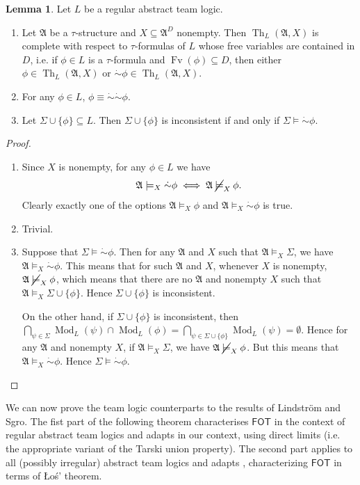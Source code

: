 \documentclass[a4paper]{amsart}
\theoremstyle{definition}
\newtheorem{lemma}[definition]{Lemma}
\theoremstyle{remark}
\newcommand{\A}{\mathcal{A}}
\DeclareMathOperator{\Fv}{Fv}
\newcommand{\cneg}{\mathord{\dot{\sim}}}
\newcommand\fot{\mathsf{FOT}}
\newcommand\nmodels{\mathbin{\cancel{\models}}}
\theoremstyle{definition}
\renewcommand{\A}{\mathfrak{A}}
\DeclareMathOperator{\Th}{Th}
\DeclareMathOperator{\Mod}{Mod}
\begin{document}
\begin{lemma}
    Let $L$ be a regular abstract team logic.
    \begin{enumerate}
        \item Let $\A$ be a $\tau$-structure and $X\subseteq\A^D$ nonempty. Then $\Th_L(\A,X)$ is complete with respect to $\tau$-formulas of $L$ whose free variables are contained in $D$, i.e. if $\phi\in L$ is a $\tau$-formula and $\Fv(\phi)\subseteq D$, then either $\phi\in\Th_L(\A,X)$ or $\cneg\phi\in\Th_L(\A,X)$.

        \item For any $\phi\in L$, $\phi \equiv \cneg\cneg\phi$.

        \item Let $\Sigma\cup\{\phi \}\subseteq L$. Then $\Sigma\cup\{\phi\}$ is inconsistent if and only if $\Sigma\models\cneg\phi$.
    \end{enumerate}
\end{lemma}
\begin{proof}\quad
    \begin{enumerate}
        \item Since $X$ is nonempty, for any $\phi\in L$ we have
        \[
            \A\models_X\cneg\phi \iff \A\nmodels_X\phi.
        \]
        Clearly exactly one of the options $\A\models_X\phi$ and $\A\models_X\cneg\phi$ is true.

        \item Trivial.

        \item Suppose that $\Sigma\models\cneg\phi$. Then for any $\A$ and $X$ such that $\A\models_X\Sigma$, we have $\A\models_X\cneg\phi$. This means that for such $\A$ and $X$, whenever $X$ is nonempty, $\A\nmodels_X\phi$, which means that there are no $\A$ and nonempty $X$ such that $\A\models_X\Sigma\cup\{\phi\}$. Hence $\Sigma\cup\{\phi\}$ is inconsistent.

        On the other hand, if $\Sigma\cup\{\phi\}$ is inconsistent, then $\bigcap_{\psi\in\Sigma}\Mod_L(\psi)\cap\Mod_L(\phi) = \bigcap_{\psi\in\Sigma\cup\{\phi\}}\Mod_L(\psi) = \emptyset$. Hence for any $\A$ and nonempty $X$, if $\A\models_X\Sigma$, we have $\A\nmodels_X\phi$. But this means that $\A\models_X\cneg\phi$. Hence $\Sigma\models\cneg\phi$. \qedhere
    \end{enumerate}
\end{proof}

We can now prove the team logic counterparts to the results of Lindström and Sgro. The fist part of the following theorem characterises $\fot$ in the context of regular abstract team logics and adapts \cite{lindstrom1974characterizing} in our context, using direct limits (i.e. the appropriate variant of the Tarski union property). The second part applies to all (possibly irregular) abstract team logics and adapts \cite{sgro1977maximal}, characterizing $\fot$ in terms of Łoś' theorem.
\end{document}
